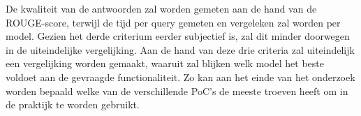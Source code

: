 De kwaliteit van de antwoorden zal worden gemeten aan de hand van de ROUGE-score, terwijl de tijd per query gemeten en vergeleken zal worden per model. Gezien het derde criterium eerder subjectief is, zal dit minder doorwegen in de uiteindelijke vergelijking. Aan de hand van deze drie criteria zal uiteindelijk een vergelijking worden gemaakt, waaruit zal blijken welk model het beste voldoet aan de gevraagde functionaliteit. Zo kan aan het einde van het onderzoek worden bepaald welke van de verschillende PoC's de meeste troeven heeft om in de praktijk te worden gebruikt.


